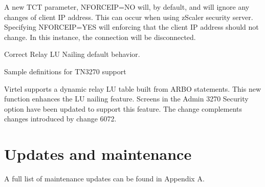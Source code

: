 \documentclass[letterpaper,10pt,english]{sphinxmanual}
\begin{document}
\sphinxAtStartPar
{}

\sphinxAtStartPar
A new TCT parameter, NFORCEIP=NO will, by default, and will ignore any changes of client IP address. This can occur when using zScaler security server. Specifying NFORCEIP=YES will enforcing that the client IP address should not change. In this instance, the connection will be disconnected.

\sphinxAtStartPar
{}

\sphinxAtStartPar
Correct Relay LU Nailing default behavior.

\sphinxAtStartPar
{}

\sphinxAtStartPar
Sample definitions for TN3270 support

\sphinxAtStartPar
{}

\sphinxAtStartPar
Virtel supports a dynamic relay LU table built from ARBO statements. This new function enhances the LU nailing feature. Screens in the Admin 3270 Security option have been updated to support this feature. The change complements changes introduced by change 6072.


\chapter{Updates and maintenance}
\label{\detokenize{TN202403:updates-and-maintenance}}
\sphinxAtStartPar
A full list of maintenance updates can be found in Appendix A.

\newpage
\end{document}
